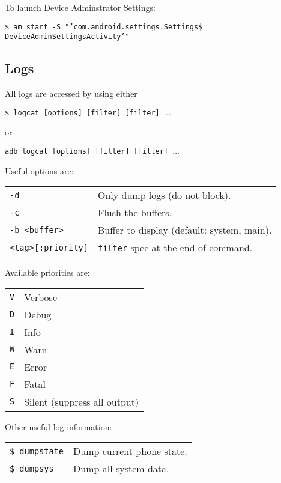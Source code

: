 \documentclass[11pt,landscape,a4paper]{article}
\begin{document}
\begin{multicols}{3}
{To launch Device Adminstrator Settings:

\texttt{\$ am start -S "'com.android.settings.Settings\$
DeviceAdminSettingsActivity'"}
}

\subsection{Logs}

All logs are accessed by using either 

\texttt{\$ logcat [options] [filter] [filter] $\ldots$} 

or 

\texttt{adb logcat [options] [filter] [filter] $\ldots$}

\vspace*{2mm}

Useful options are:

\begin{tabular}{@{}ll@{}}
\texttt{-d} & Only dump logs (do not block).\\
\texttt{-c} & Flush the buffers.\\
\texttt{-b <buffer>} & Buffer to display (default: system, main).\\
\texttt{<tag>[:priority]} & \texttt{filter} spec at the end of command.\\
\end{tabular}

\vspace*{2mm}

Available priorities are:

\begin{addmargin}{10mm}
\begin{tabular}{@{}ll@{}}
\texttt{V} & Verbose\\
\texttt{D} & Debug\\
\texttt{I} & Info\\
\texttt{W} & Warn\\
\texttt{E} & Error\\
\texttt{F} & Fatal\\
\texttt{S} & Silent (suppress all output)\\
\end{tabular}
\end{addmargin}

\vspace*{2mm}

Other useful log information:
\begin{tabular}{@{}ll@{}}
\texttt{\$ dumpstate} & Dump current phone state.\\
\texttt{\$ dumpsys} & Dump all system data.\\
\end{tabular}


\end{multicols}
\end{document}
